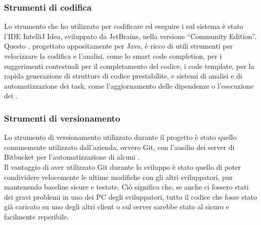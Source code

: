 		\subsubsection{Strumenti di codifica}
		Lo strumento che ho utilizzato per codificare ed eseguire i  sul sistema è stato l'IDE IntelliJ Idea, sviluppato da JetBrains, nella versione  ``Community Edition''. Questo , progettato appositamente per Java, è ricco di utili strumenti per velocizzare la codifica e l'analisi, come lo smart code completion, per i suggerimenti contestuali per il completamento del codice, i code template, per la rapida generazione di strutture di codice prestabilite, e sistemi di analisi e di automatizzazione dei task, come l'aggiornamento delle dipendenze o l'esecuzione dei .

		\subsubsection{Strumenti di versionamento}
		Lo strumento di versionamento utilizzato durante il progetto è stato quello comunemente utilizzato dall'azienda, ovvero Git, con l'ausilio dei server di Bitbucket per l'automatizzazione di alcuni .
		\\
		Il vantaggio di aver utilizzato Git durante lo sviluppo è stato quello di poter condividere velocemente le ultime modifiche con gli altri sviluppatori, pur mantenendo baseline sicure e testate. Ciò significa che, se anche ci fossero stati dei gravi problemi in uno dei PC degli sviluppatori, tutto il codice che fosse stato già caricato su uno degli altri client o sul server sarebbe stato al sicuro e facilmente reperibile.
		
